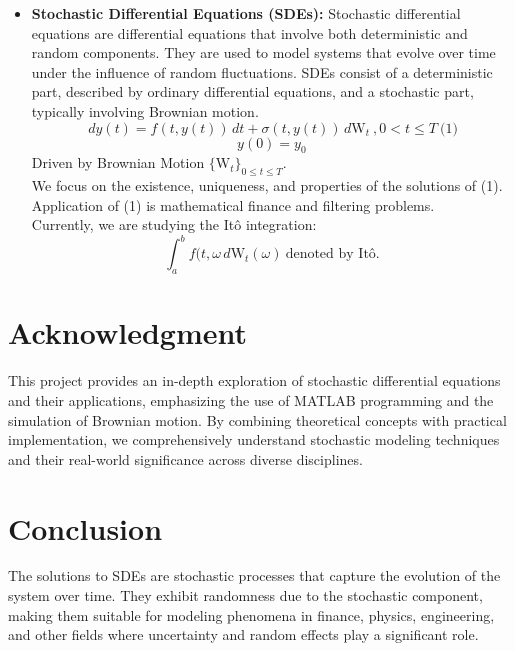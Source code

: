 \documentclass{article}
\newcommand{\W}{\text{W}}
\begin{document}
\begin{itemize}
    \item \textbf{Stochastic Differential Equations (SDEs):} Stochastic differential equations are differential equations that involve both deterministic and random components. They are used to model systems that evolve over time under the influence of random fluctuations. SDEs consist of a deterministic part, described by ordinary differential equations, and a stochastic part, typically involving Brownian motion.
    \[\,dy(t) = f(t,y(t))\,dt + \sigma(t,y(t))\,d\W_t \ , 0<t\leq T \ \text{(1)}\]
    \[y(0)=y_0\]
    Driven by Brownian Motion $\{\W_t\}_{0 \leq t \leq T}$.\\
    We focus on the existence, uniqueness, and properties of the solutions of (1).\\
    Application of (1) is mathematical finance and filtering problems.\\
    Currently, we are studying the Itô integration:
    \[\int_{a}^{b}{f(t,\omega}\,d\W_t(\omega) \ \text{denoted by Itô.}\]
    
    
    
\end{itemize}


\section{Acknowledgment}
This project provides an in-depth exploration of stochastic differential equations and their applications, emphasizing the use of MATLAB programming and the simulation of Brownian motion. By combining theoretical concepts with practical implementation, we comprehensively understand stochastic modeling techniques and their real-world significance across diverse disciplines.
\section{Conclusion}
The solutions to SDEs are stochastic processes that capture the evolution of the system over time. They exhibit randomness due to the stochastic component, making them suitable for modeling phenomena in finance, physics, engineering, and other fields where uncertainty and random effects play a significant role.
\end{document}
